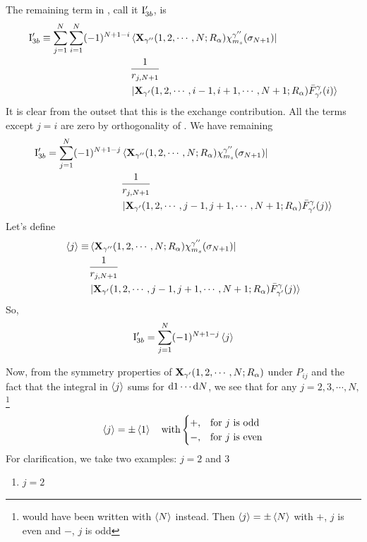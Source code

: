 \documentclass[aps,pra,groupedaddress,12pt,
               amsfonts,amssymb,
               preprint
    ]{revtex4}
\begin{document}
\begin{enumerate}
The remaining term in , call it $\mathrm{I}_{3b}'$, is
\begin{equation}
  \label{eq:intg3g}
  \begin{split}
      \mathrm{I}_{3b}' \equiv \sum_{j=1}^N\sum_{i=1}^N(-1)^{N+1-i}
              & \mathinner{\langle{\mathbf{X}_{\gamma''}(1,2,\cdots,N;R_\alpha)\chi_{m_s}^{\gamma''}(\sigma_{N+1})}|}  \\
              & \dfrac{1}{r_{j,N+1}}    \\
              & \mathinner{|{\mathbf{X}_{\gamma'}(1,2,\cdots,i-1,i+1,\cdots,N+1;R_\alpha)\bar{F}_{\gamma'}^{\gamma}(i)}\rangle}
  \end{split}
\end{equation}
It is clear from the outset that this is the exchange contribution. All
the terms except $j=i$ are zero by orthogonality of . We have
remaining
\begin{equation}
  \label{eq:intg3h}
  \begin{split}
      \mathrm{I}_{3b}' = \sum_{j=1}^N(-1)^{N+1-j}
              & \mathinner{\langle{\mathbf{X}_{\gamma''}(1,2,\cdots,N;R_\alpha)\chi_{m_s}^{\gamma''}(\sigma_{N+1})}|}  \\
              & \dfrac{1}{r_{j,N+1}}    \\
              & \mathinner{|{\mathbf{X}_{\gamma'}(1,2,\cdots,j-1,j+1,\cdots,N+1;R_\alpha)\bar{F}_{\gamma'}^{\gamma}(j)}\rangle} 
  \end{split}
\end{equation}
Let's define
\begin{equation*}
  \begin{split}
  \mathinner{\langle{j}\rangle} \equiv & \mathinner{\langle{\mathbf{X}_{\gamma''}(1,2,\cdots,N;R_\alpha)\chi_{m_s}^{\gamma''}(\sigma_{N+1})}|}  \\
              & \dfrac{1}{r_{j,N+1}}    \\
              & \mathinner{|{\mathbf{X}_{\gamma'}(1,2,\cdots,j-1,j+1,\cdots,N+1;R_\alpha)\bar{F}_{\gamma'}^{\gamma}(j)}\rangle} 
  \end{split}
\end{equation*}
So,
\begin{equation*}
  \mathrm{I}_{3b}' = \sum_{j=1}^N(-1)^{N+1-j}\mathinner{\langle{j}\rangle}
\end{equation*}

Now, from the symmetry properties of $\mathbf{X}_{\gamma'}(1,2,\cdots,N;R_\alpha)$ under $P_{ij}$ and the fact
that the integral in $\mathinner{\langle{j}\rangle}$ sums for $\mathrm{d} 1\cdots \mathrm{d} N$, we see
that for any $j=2,3,\cdots,N,$\footnote{would have been written with
  $\mathinner{\langle{N}\rangle}$ instead. Then $\mathinner{\langle{j}\rangle} = \pm\mathinner{\langle{N}\rangle}$ with $+$, $j$
  is even and $-$, $j$ is odd}
\begin{equation}
  \label{eq:intg3i}
  \mathinner{\langle{j}\rangle} = \pm\mathinner{\langle{1}\rangle} \quad \text{with}
  \begin{cases}
    +, & \text{for $j$ is odd} \\
    -, & \text{for $j$ is even}
  \end{cases}
\end{equation}
For clarification, we take two examples: $j = 2$ and $3$
\begin{enumerate}
\item $j = 2$


\end{enumerate}
\end{enumerate}
\end{document}
